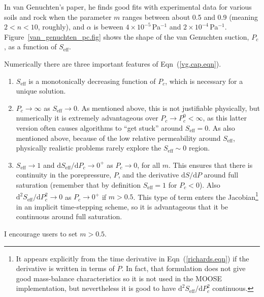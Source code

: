 \documentclass[]{scrreprt}
\begin{document}
In van Genuchten's paper, he finds good fits with experimental data
for various soils and rock when the parameter $m$ ranges between about
0.5 and 0.9 (meaning $2<n<10$, roughly), and $\alpha$ is beween
$4\times 10^{-5}$\,Pa$^{-1}$ and $2\times 10^{-4}$\,Pa$^{-1}$.
Figure~\ref{van_genuchten_pc.fig} shows the shape of the van Genuchten
suction, $P_{c}$, as a function of $S_{\mathrm{eff}}$.

Numerically there are three important features of
Eqn~(\ref{vg.cap.eqn}).
\begin{enumerate}
\item $S_{\mathrm{eff}}$ is a monotonically decreasing function of
  $P_{c}$, which is necessary for a unique solution.
\item $P_{c}\rightarrow \infty$ as $S_{\mathrm{eff}}\rightarrow 0$.  As mentioned
above, this is not justifiable physically, but numerically it is
extremely advantageous over $P_{c}\rightarrow P_{c}^{0}<\infty$, as
this latter version often causes algorithms to ``get stuck'' around
$S_{\mathrm{eff}} = 0$.  As also mentioned above, because of the low
relative permeability around $S_{\mathrm{eff}}$, physically realistic
problems rarely explore the $S_{\mathrm{eff}}\sim 0$ region.
\item $S_{\mathrm{eff}}\rightarrow 1$ and
  $\mathrm{d}S_{\mathrm{eff}}/\mathrm{d}P_{c} \rightarrow 0^{+}$ as
  $P_{c}\rightarrow 0$, for all $m$.  This ensures that there is
  continuity in the porepressure, $P$, and the derivative
  $\mathrm{d}S/\mathrm{d}P$ around full saturation (remember that by definition
  $S_{\mathrm{eff}}=1$ for $P_{c}<0$).  Also
  $\mathrm{d}^{2}S_{\mathrm{eff}}/\mathrm{d}P_{c}^{2} \rightarrow 0$
  as $P_{c}\rightarrow 0^{+}$ if $m>0.5$.  This type of term enters the
  Jacobian\footnote{It appears explicitly from the time derivative in
    Eqn~(\ref{richards.eqn}) if the derivative is written in terms of
    $\dot{P}$.  In fact, that formulation does not give good
    mass-balance characteristics so it is not used in the MOOSE implementation, but
    nevertheless it is good to have
    $\mathrm{d}^{2}S_{\mathrm{eff}}/\mathrm{d}P_{c}^{2}$ continuous.}
  in an implicit time-stepping scheme, so it is advantageous that it
  be continuous around full saturation.
\end{enumerate}
I encourage users to set $m>0.5$.
\end{document}
